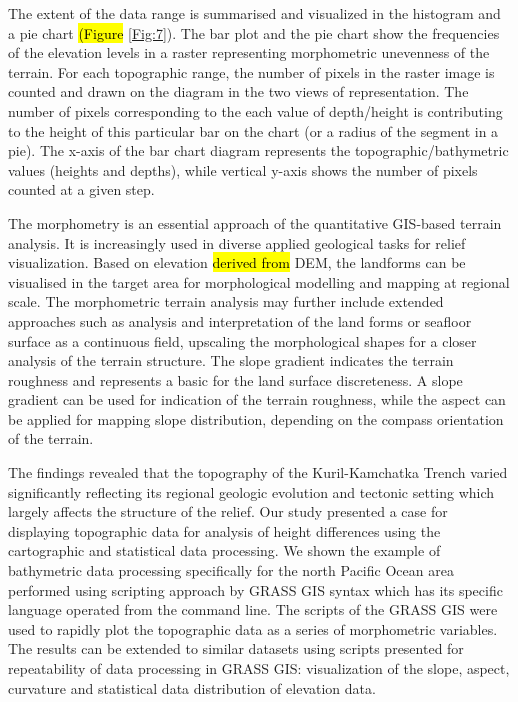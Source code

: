\documentclass[technologies,article,submit,pdftex,moreauthors]{Definitions/mdpi}
\begin{document}
The extent of the data range is summarised and visualized in the histogram and a pie chart \hl{(Figure }\ref{Fig:7}). The bar plot and the pie chart show the frequencies of the elevation levels in a raster representing morphometric unevenness of the terrain. For each topographic range, the number of pixels in the raster image is counted and drawn on the diagram in the two views of representation. The number of pixels corresponding to the each value of depth/height is contributing to the height of this particular bar on the chart (or a radius of the segment in a pie). The x-axis of the bar chart diagram represents the topographic/bathymetric values (heights and depths), while vertical y-axis shows the number of pixels counted at a given step.

The morphometry is an essential approach of the quantitative GIS-based terrain analysis. It is increasingly used in diverse applied geological tasks for relief visualization. Based on elevation \hl{derived from} DEM, the landforms can be visualised in the target area for morphological modelling and mapping at regional scale. The morphometric terrain analysis may further include extended approaches such as analysis and interpretation of the land forms or seafloor surface as a continuous field, upscaling the morphological shapes for a closer analysis of the terrain structure. The slope gradient indicates the terrain roughness and represents a basic for the land surface discreteness. A slope gradient can be used for indication of the terrain roughness, while the aspect can be applied for mapping slope distribution, depending on the compass orientation of the terrain. 

The findings revealed that the topography of the Kuril-Kamchatka Trench varied significantly reflecting its regional geologic evolution and tectonic setting which largely affects the structure of the relief. Our study presented a case for displaying topographic data for analysis of height differences using the cartographic and statistical data processing. We shown the example of bathymetric data processing specifically for the north Pacific Ocean area performed using scripting approach by GRASS GIS syntax which has its specific language operated from the command line. The scripts of the GRASS GIS were used to rapidly plot the topographic data as a series of morphometric variables. The results can be extended to similar datasets using scripts presented for repeatability of data processing in GRASS GIS: visualization of the slope, aspect, curvature and statistical data distribution of elevation data.
\end{document}
